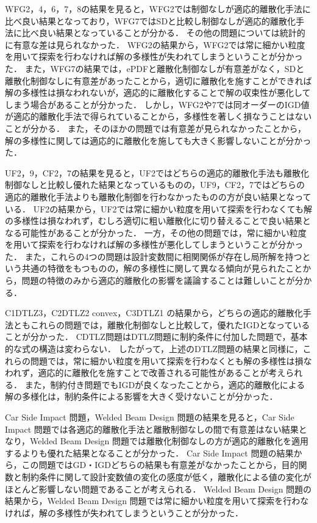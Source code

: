 \documentclass[../main/main]{subfiles}
\begin{document}
WFG2，4，6，7，8の結果を見ると，WFG2では制御なしが適応的離散化手法に比べ良い結果となっており，WFG7ではSDと比較し制御なしが適応的離散化手法に比べ良い結果となっていることが分かる．
その他の問題については統計的に有意な差は見られなかった．
WFG2の結果から，WFG2では常に細かい粒度を用いて探索を行わなければ解の多様性が失われてしまうということが分かった．
また，WFG7の結果では，ePDFと離散化制御なしが有意差がなく，SDと離散化制御なしに有意差があったことから，適切に離散化を施すことができれば解の多様性は損なわれないが，適応的に離散化することで解の収束性が悪化してしまう場合があることが分かった．
しかし，WFG2や7では同オーダーのIGD値が適応的離散化手法で得られていることから，多様性を著しく損なうことはないことが分かる．
また，そのほかの問題では有意差が見られなかったことから，解の多様性に関しては適応的に離散化を施しても大きく影響しないことが分かった．

UF2，9，CF2，7の結果を見ると，UF2ではどちらの適応的離散化手法も離散化制御なしと比較し優れた結果となっているものの，UF9，CF2，7ではどちらの適応的離散化手法よりも離散化制御を行わなかったものの方が良い結果となっている．
UF2の結果から，UF2では常に細かい粒度を用いて探索を行わなくても解の多様性は損なわれず，むしろ適切に粗い離散化に切り替えることで良い結果となる可能性があることが分かった．
一方，その他の問題では，常に細かい粒度を用いて探索を行わなければ解の多様性が悪化してしまうということが分かった．
また，これらの4つの問題は設計変数間に相関関係が存在し局所解を持つという共通の特徴をもつものの，解の多様性に関して異なる傾向が見られたことから，問題の特徴のみから適応的離散化の影響を議論することは難しいことが分かる．

C1DTLZ3，C2DTLZ2 convex，C3DTLZ1 の結果から，どちらの適応的離散化手法ともこれらの問題では，離散化制御なしと比較して，優れたIGDとなっていることが分かった．
CDTLZ問題はDTLZ問題に制約条件に付加した問題で，基本的な式の構造は変わらない．
したがって，上述のDTLZ問題の結果と同様に，これらの問題では，常に細かい粒度を用いて探索を行わなくとも解の多様性は損なわれず，適応的に離散化を施すことで改善される可能性があることが考えられる．
また，制約付き問題でもIGDが良くなったことから，適応的離散化による解の多様化は，制約条件による影響を大きく受けないことが分かった．

Car Side Impact 問題，Welded Beam Design 問題の結果を見ると，Car Side Impact 問題では各適応的離散化手法と離散制御なしの間で有意差はない結果となり，Welded Beam Design 問題では離散化制御なしの方が適応的離散化を適用するよりも優れた結果となることが分かった．
Car Side Impact 問題の結果から，この問題ではGD・IGDどちらの結果も有意差がなかったことから，目的関数と制約条件に関して設計変数値の変化の感度が低く，離散化による値の変化がほとんど影響しない問題であることが考えられる．
Welded Beam Design 問題の結果から，Welded Beam Design 問題では常に細かい粒度を用いて探索を行わなければ，解の多様性が失われてしまうということが分かった．
\end{document}
